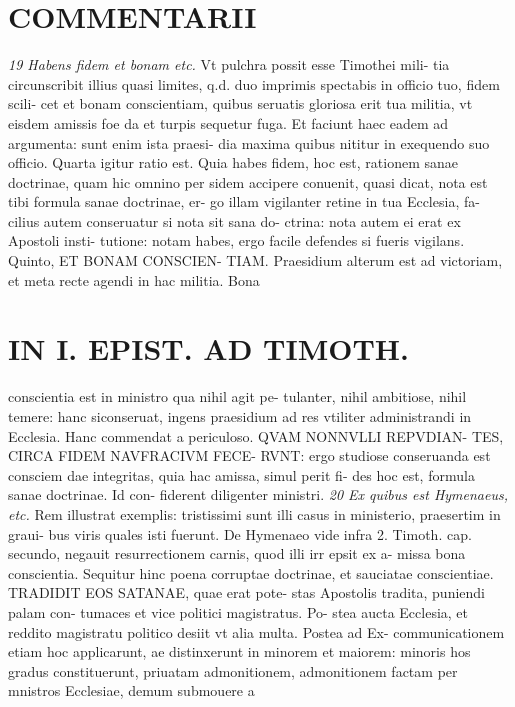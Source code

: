 \documentclass{article}
\begin{document}
\begin{pages}
\section*{COMMENTARII }
\marginpar{[ p.40 ]}
\textit{19 Habens fidem et bonam etc. }\pstart Vt pulchra possit esse Timothei mili- tia circunscribit illius quasi limites, q.d. duo imprimis spectabis in officio tuo, fidem scili- cet et bonam conscientiam, quibus seruatis gloriosa erit tua militia, vt eisdem amissis foe da et turpis sequetur fuga. Et faciunt haec eadem ad argumenta: sunt enim ista praesi- dia maxima quibus nititur in exequendo suo officio.  \pend\pstart Quarta igitur ratio est. Quia habes fidem, hoc est, rationem sanae doctrinae, quam hic omnino per sidem accipere conuenit, quasi dicat, nota est tibi formula sanae doctrinae, er- go illam vigilanter retine in tua Ecclesia, fa- cilius autem conseruatur si nota sit sana do- ctrina: nota autem ei erat ex Apostoli insti- tutione: notam habes, ergo facile defendes si fueris vigilans.  \pend\pstart Quinto, ET BONAM CONSCIEN- TIAM. Praesidium alterum est ad victoriam, et meta recte agendi in hac militia. Bona  \pend
\section*{IN I. EPIST. AD TIMOTH. }
\marginpar{[ p.41 ]}\pstart conscientia est in ministro qua nihil agit pe- tulanter, nihil ambitiose, nihil temere: hanc siconseruat, ingens praesidium ad res vtiliter administrandi in Ecclesia. Hanc commendat a periculoso. QVAM NONNVLLI REPVDIAN- TES, CIRCA FIDEM NAVFRACIVM FECE- RVNT: ergo studiose conseruanda est consciem dae integritas, quia hac amissa, simul perit fi- des hoc est, formula sanae doctrinae. Id con- fiderent diligenter ministri.  \pend
\textit{20 Ex quibus est Hymenaeus, etc. }\pstart Rem illustrat exemplis: tristissimi sunt illi casus in ministerio, praesertim in graui- bus viris quales isti fuerunt. De Hymenaeo vide infra 2. Timoth. cap. secundo, negauit resurrectionem carnis, quod illi irr epsit ex a- missa bona conscientia. Sequitur hinc poena corruptae doctrinae, et sauciatae conscientiae. TRADIDIT EOS SATANAE, quae erat pote- stas Apostolis tradita, puniendi palam con- tumaces et vice politici magistratus. Po- stea aucta Ecclesia, et reddito magistratu politico desiit vt alia multa. Postea ad Ex- communicationem etiam hoc applicarunt, ae distinxerunt in minorem et maiorem: minoris hos gradus constituerunt, priuatam admonitionem, admonitionem factam per mnistros Ecclesiae, demum submouere a  \pend

\end{pages}
\end{document}
